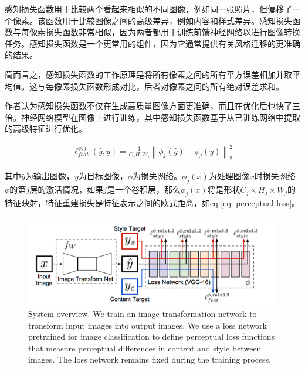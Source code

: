 \documentclass[letterpaper,12pt]{article}
\begin{document}
	感知损失函数用于比较两个看起来相似的不同图像，例如同一张照片，但偏移了一个像素。该函数用于比较图像之间的高级差异，例如内容和样式差异。感知损失函数与每像素损失函数非常相似，因为两者都用于训练前馈神经网络以进行图像转换任务。感知损失函数是一个更常用的组件，因为它通常提供有关风格迁移的更准确的结果。
	
	简而言之，感知损失函数的工作原理是将所有像素之间的所有平方误差相加并取平均值。这与每像素损失函数形成对比，后者对像素之间的所有绝对误差求和\cite{johnson2016perceptual}。
	
	作者认为感知损失函数不仅在生成高质量图像方面更准确，而且在优化后也快了三倍。神经网络模型在图像上进行训练，其中感知损失函数基于从已训练网络中提取的高级特征进行优化。
	
	\begin{equation}
		\begin{aligned}
			\ell_{feat}^{\phi,j} (\hat{y},y) = \frac{1}{C_{j}H_{j}W_{j}}{\left\| \phi_{j}(\hat{y})-\phi_{j}(y)\right\|}_{2}^2
		\end{aligned}
		\label{eq: perceptual loss}
	\end{equation}
	
	其中$\hat{y}$为输出图像，$y$为目标图像，$\phi$为损失网络。$\phi_{j}(x)$为处理图像$x$时损失网络$\phi$的第$j$层的激活情况，如果$j$是一个卷积层，那么$\phi_{j}(x)$将是形状$C_{j} \times H_{j} \times W_{j}$的特征映射，特征重建损失是特征表示之间的欧式距离，如eq \ref{eq: perceptual loss}。
	
	\begin{figure}[ht] 
		\centering \includegraphics[width=0.8\columnwidth]{perceptual}
		\captionsetup{font=scriptsize}
		\caption{
			\label{fig: perceptual loss} %
			System overview. We train an image transformation network to transform input images into output images. We use a loss network pretrained for image classification to define perceptual loss functions that measure perceptual differences in content and style between images. The loss network remains fixed during the training process.
		}
	\end{figure}
	
\end{document}
